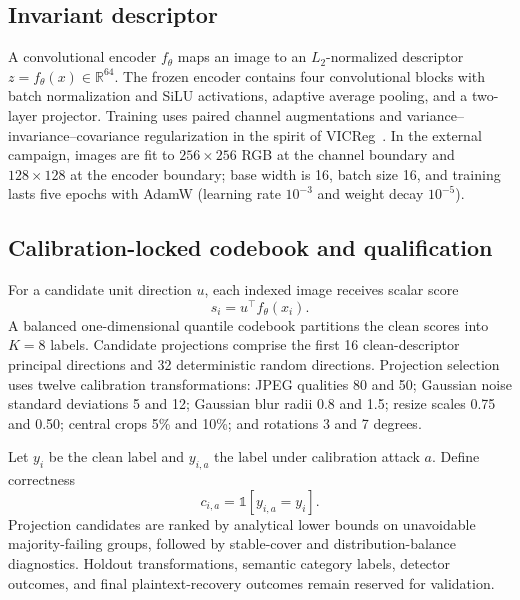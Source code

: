 \subsection{Invariant descriptor}
A convolutional encoder $f_\theta$ maps an image to an $L_2$-normalized descriptor $z=f_\theta(x)\in\mathbb{R}^{64}$. The frozen encoder contains four convolutional blocks with batch normalization and SiLU activations, adaptive average pooling, and a two-layer projector. Training uses paired channel augmentations and variance--invariance--covariance regularization in the spirit of VICReg~\cite{bardes2022vicreg}. In the external campaign, images are fit to $256\times256$ RGB at the channel boundary and $128\times128$ at the encoder boundary; base width is 16, batch size 16, and training lasts five epochs with AdamW (learning rate $10^{-3}$ and weight decay $10^{-5}$).

\subsection{Calibration-locked codebook and qualification}
For a candidate unit direction $u$, each indexed image receives scalar score
\begin{equation}
s_i=u^\top f_\theta(x_i).
\end{equation}
A balanced one-dimensional quantile codebook partitions the clean scores into $K=8$ labels. Candidate projections comprise the first 16 clean-descriptor principal directions and 32 deterministic random directions. Projection selection uses twelve calibration transformations: JPEG qualities 80 and 50; Gaussian noise standard deviations 5 and 12; Gaussian blur radii 0.8 and 1.5; resize scales 0.75 and 0.50; central crops 5\% and 10\%; and rotations 3 and 7 degrees.

Let $y_i$ be the clean label and $y_{i,a}$ the label under calibration attack $a$. Define correctness
\begin{equation}
c_{i,a}=\mathbb{1}[y_{i,a}=y_i].
\end{equation}
Projection candidates are ranked by analytical lower bounds on unavoidable majority-failing groups, followed by stable-cover and distribution-balance diagnostics. Holdout transformations, semantic category labels, detector outcomes, and final plaintext-recovery outcomes remain reserved for validation.

